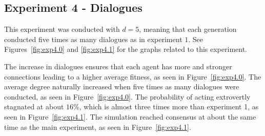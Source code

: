 \clearpage
\subsection{Experiment 4 - Dialogues}
This experiment was conducted with $d = 5$, meaning that each generation conducted five times as many dialogues as in experiment $1$. See Figures~\ref{fig:exp4.0} and \ref{fig:exp4.1} for the graphs related to this experiment. 

The increase in dialogues ensures that each agent has more and stronger connections leading to a higher average fitness, as seen in Figure~\ref{fig:exp4.0}. The average degree naturally increased when five times as many dialogues were conducted, as seen in Figure~\ref{fig:exp4.0}. The probability of acting extrovertly stagnated at about $16\%$, which is almost three times more than experiment 1, as seen in Figure~\ref{fig:exp4.1}. The simulation reached consensus at about the same time as the main experiment, as seen in Figure~\ref{fig:exp4.1}.  

